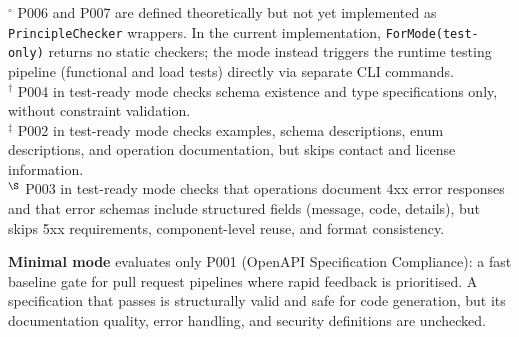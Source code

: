 \begin{table}[htbp]
\centering
\caption{Validation modes and the principles each mode evaluates. \cmark{} = full check set; $\sim$ = partial check set (detailed in the notes below); \cmark$^{\circ}$ = runtime principle exercised outside the static checker registry. The registry's \texttt{ForMode()} method returns only the checkers listed for each mode.}
\label{tab:validation-modes}
\small
{}

\vspace{2mm}
\noindent\small{$^{\circ}$ P006 and P007 are defined theoretically but not yet implemented as \texttt{PrincipleChecker} wrappers. In the current implementation, \texttt{ForMode(test-only)} returns no static checkers; the mode instead triggers the runtime testing pipeline (functional and load tests) directly via separate CLI commands.}\\
\noindent\small{$^\dagger$ P004 in test-ready mode checks schema existence and type specifications only, without constraint validation.}\\
\noindent\small{$^\ddagger$ P002 in test-ready mode checks examples, schema descriptions, enum descriptions, and operation documentation, but skips contact and license information.}\\
\noindent\small{$^\S$ P003 in test-ready mode checks that operations document 4xx error responses and that error schemas include structured fields (message, code, details), but skips 5xx requirements, component-level reuse, and format consistency.}
\end{table}

\textbf{Minimal mode} evaluates only P001 (OpenAPI Specification Compliance): a fast baseline gate for pull request pipelines where rapid feedback is prioritised. A specification that passes is structurally valid and safe for code generation, but its documentation quality, error handling, and security definitions are unchecked.

